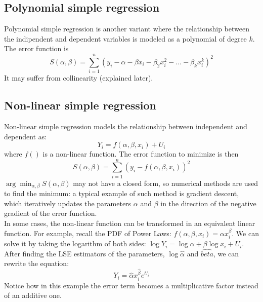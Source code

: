 \subsection{Polynomial simple regression}
Polynomial simple regression is another variant where the relationship between the indipendent and dependent variables is modeled as a polynomial of degree $k$. The error function is
\begin{equation*}
    S(\alpha, \beta) = \sum_{i=1}^n (y_i - \alpha - \beta x_i - \beta_2 x_i^2 - \ldots - \beta_k x_i^k)^2
\end{equation*}   
It may suffer from collinearity (explained later).

\subsection{Non-linear simple regression}
Non-linear simple regression models the relationship between independent and dependent as:
\begin{equation*}
    Y_i = f(\alpha, \beta, x_i) + U_i
\end{equation*}   
where $f()$ is a non-linear function. The error function to minimize is then
\begin{equation*}
    S(\alpha, \beta) = \sum_{i=1}^n (y_i - f(\alpha, \beta, x_i))^2
\end{equation*}   
$\arg\min_{\alpha, \beta} S(\alpha, \beta)$ may not have a closed form, so numerical methods are used to find the minimum: a typical example of such method is gradient descent, which iteratively updates the parameters $\alpha$ and $\beta$ in the direction of the negative gradient of the error function.\\
In some cases, the non-linear function can be transformed in an equivalent linear function. For example, recall the PDF of Power Laws: $f(\alpha, \beta, x_i) = \alpha x_i^{\beta}$. We can solve it by taking the logarithm of both sides: $\log Y_i = \log \alpha + \beta \log x_i + U_i$. After finding the LSE estimators of the parameters, $\log \hat{\alpha}$ and $\hat{beta}$, we can rewrite the equation:
\begin{equation*}
    Y_i = \hat{\alpha} x_i^{\hat{\beta}} e^{U_i}
\end{equation*}   
Notice how in this example the error term becomes a multiplicative factor instead of an additive one.

